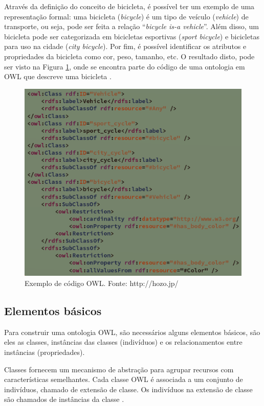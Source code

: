 \documentclass{bcc}
\begin{document}
Através da definição do conceito de bicicleta, é possível ter um exemplo de uma representação formal: uma bicicleta (\textit{bicycle}) é um tipo de veículo (\textit{vehicle}) de transporte, ou seja, pode ser feita a relação “\textit{bicycle is-a vehicle}”. Além disso, um bicicleta pode ser categorizada em bicicletas esportivas (\textit{sport bicycle}) e bicicletas para uso na cidade (\textit{city bicycle}). Por fim, é possível identificar os atributos e propriedades da bicicleta como cor, peso, tamanho, etc. O resultado disto, pode ser visto na Figura \ref{fig:codowl}, onde se encontra parte do código de uma ontologia em OWL que descreve uma bicicleta \cite{isotani2015}.


\begin{figure}[H]
\centering
\includegraphics[width=.9\textwidth]{Figuras/codigo_owl.png}
\caption{Exemplo de código OWL. Fonte: http://hozo.jp/}
\label{fig:codowl}
\end{figure}

\subsection{Elementos básicos}
 
Para construir uma ontologia OWL, são necessários alguns elementos básicos, são eles as classes, instâncias das classes (indivíduos) e os relacionamentos entre instâncias (propriedades).
 
Classes fornecem um mecanismo de abstração para agrupar recursos com características semelhantes. Cada classe OWL é associada a um conjunto de indivíduos, chamado de extensão de classe. Os indivíduos na extensão de classe são chamados de instâncias da classe \cite{mcguinness}. 
\end{document}
